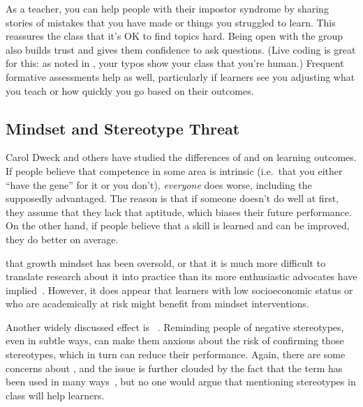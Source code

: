 As a teacher,
you can help people with their impostor syndrome
by sharing stories of mistakes that you have made or things you struggled to learn.
This reassures the class that it's OK to find topics hard.
Being open with the group also builds trust
and gives them confidence to ask questions.
(Live coding is great for this:
as noted in ,
your typos show your class that you're human.)
Frequent formative assessments help as well,
particularly if learners see you adjusting what you teach or how quickly you go
based on their outcomes.

\subsection*{Mindset and Stereotype Threat}

Carol Dweck and others
have studied the differences of 
and  on learning outcomes.
If people believe that competence in some area is intrinsic
(i.e.\ that you either ``have the gene'' for it or you don't),
\emph{everyone} does worse,
including the supposedly advantaged.
The reason is that if someone doesn't do well at first,
they assume that they lack that aptitude,
which biases their future performance.
On the other hand,
if people believe that a skill is learned and can be improved,
they do better on average.

that growth mindset has been oversold,
or that it is much more difficult to translate research about it into practice
than its more enthusiastic advocates have implied~\cite{Sisk2018}.
However,
it does appear that learners with low socioeconomic status or who are academically at risk might benefit from mindset interventions.

Another widely discussed effect is ~\cite{Stee2011}.
Reminding people of negative stereotypes,
even in subtle ways,
can make them anxious about the risk of confirming those stereotypes,
which in turn can reduce their performance.
Again,
there are some concerns about
,
and the issue is further clouded by the fact that the term has been used in many ways~\cite{Shap2007},
but no one would argue that mentioning stereotypes in class will help learners.

